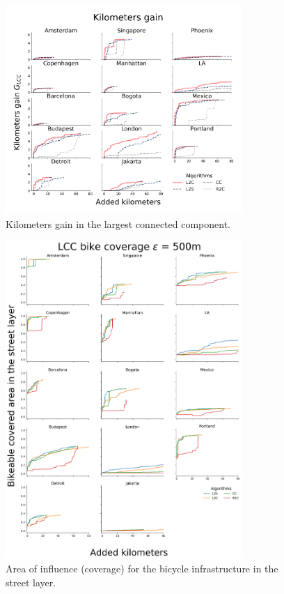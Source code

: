 \begin{figure}[h!]
  \centering
  \includegraphics[width=0.8\textwidth]{images/datadriven/SI_Gain.png}
  \caption{Kilometers gain in the largest connected component.}
  \label{fig:Gain}
\end{figure}

\begin{figure}[h!]
  \centering
  \includegraphics[width=0.8\textwidth]{images/datadriven/Reviewer_Coverage.png}
  \caption{Area of influence (coverage) for the bicycle infrastructure in the street layer.}
  \label{fig:Coverage}
\end{figure}

